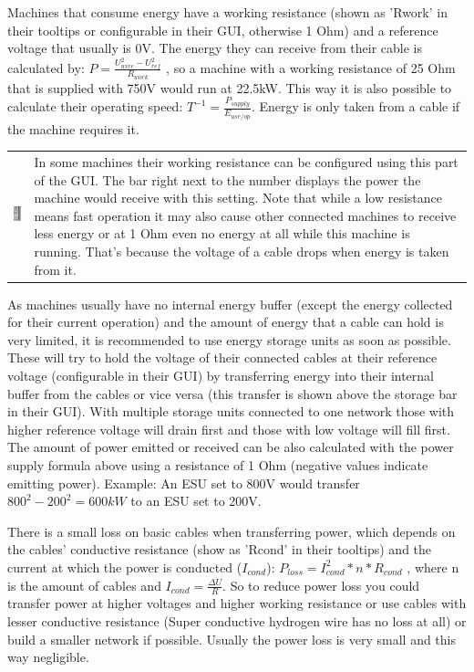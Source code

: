 \documentclass[11pt]{article} %
\makeatletter
\newcommand{\imgtex}{\begin{tabularx}{\textwidth}{@{}c@{ }X@{}}}
\makeatother
\begin{document}
Machines that consume energy have a working resistance (shown as 'Rwork' in their tooltips or configurable in their GUI, otherwise 1 Ohm) and a reference voltage that usually is 0V. The energy they can receive from their cable is calculated by: ${P = \frac{U_{wire}^2 - U_{ref}^2}{R_{work}}}$ , so a machine with a working resistance of 25 Ohm that is supplied with 750V would run at 22.5kW. This way it is also possible to calculate their operating speed: ${T^{-1} = \frac{P_{supply}}{E_{use/op}}}$. Energy is only taken from a cable if the machine requires it. 
\imgtex
\includegraphics[align = t]{RworkCfg} & In some machines their working resistance can be configured using this part of the GUI. The bar right next to the number displays the power the machine would receive with this setting. Note that while a low resistance means fast operation it may also cause other connected machines to receive less energy or at 1 Ohm even no energy at all while this machine is running. That's because the voltage of a cable drops when energy is taken from it. \\
\end{tabularx}

As machines usually have no internal energy buffer (except the energy collected for their current operation) and the amount of energy that a cable can hold is very limited, it is recommended to use energy storage units as soon as possible. These will try to hold the voltage of their connected cables at their reference voltage (configurable in their GUI) by transferring energy into their internal buffer from the cables or vice versa (this transfer is shown above the storage bar in their GUI). With multiple storage units connected to one network those with higher reference voltage will drain first and those with low voltage will fill first. The amount of power emitted or received can be also calculated with the power supply formula above using a resistance of 1 Ohm (negative values indicate emitting power). Example: An ESU set to 800V would transfer ${800^2 - 200^2 = 600kW}$ to an ESU set to 200V.

There is a small loss on basic cables when transferring power, which depends on the cables' conductive resistance (show as 'Rcond' in their tooltips) and the current at which the power is conducted ($I_{cond}$): ${P_{loss} = I_{cond}^2 * n * R_{cond}}$ , where n is the amount of cables and ${I_{cond} = \frac{\Delta U}{R}}$. So to reduce power loss you could transfer power at higher voltages and higher working resistance or use cables with lesser conductive resistance (Super conductive hydrogen wire has no loss at all) or build a smaller network if possible. Usually the power loss is very small and this way negligible.
\end{document}
